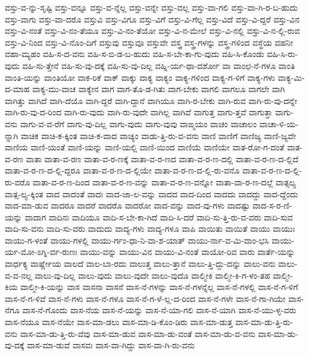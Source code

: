 {ವಸ್ತು-ವ-ನ್ನು-ಸೃಷ್ಟಿ
ವಸ್ತು-ವನ್ನೂ
ವಸ್ತು-ವ-ನ್ನೆಲ್ಲ
ವಸ್ತು-ವನ್ನೇ
ವಸ್ತು-ವಲ್ಲ
ವಸ್ತು-ವಾ-ಗಲಿ
ವಸ್ತು-ವಾ-ಗಿ-ರ-ಬ-ಹುದು
ವಸ್ತು-ವಾಗು
ವಸ್ತು-ವಾ-ದರೊ
ವಸ್ತುವಿ
ವಸ್ತು-ವಿಗೂ
ವಸ್ತು-ವಿಗೆ
ವಸ್ತು-ವಿ-ಗೆಲ್ಲ
ವಸ್ತು-ವಿದೆ
ವಸ್ತು-ವಿ-ದ್ದರೆ
ವಸ್ತು-ವಿನ
ವಸ್ತು-ವಿ-ನಂತೆ
ವಸ್ತು-ವಿ-ನಂ-ತೆಯೂ
ವಸ್ತು-ವಿ-ನಂ-ತೆಯೋ
ವಸ್ತು-ವಿ-ನ-ಮೇಲೆ
ವಸ್ತು-ವಿ-ನಲ್ಲಿ
ವಸ್ತು-ವಿ-ನ-ಲ್ಲಿ-ರುವ
ವಸ್ತು-ವಿ-ನಿಂದ
ವಸ್ತು-ವಿ-ನೊಂ-ದಿಗೆ
ವಸ್ತುವು
ವಸ್ತುವೂ
ವಸ್ತುವೇ
ವಸ್ತ್ರ
ವಸ್ತ್ರ-ಗಳನ್ನು
ವಸ್ತ್ರ-ಗಳಿಂದ
ವಸ್ಥೆಯ
ವಹನೀ
ವಹಾ-ಮ್ಯಹಂ
ವಹಿ-ಸ-ದ-ವನು
ವಹಿ-ಸ-ಬಿ-ಡ-ಬ-ಹುದು
ವಹಿ-ಸ-ಬೇ-ಕಾ-ಗು-ವುದು
ವಹಿ-ಸಿ-ಕೊಂಡು
ವಹಿ-ಸಿ-ರು-ವುದು
ವಹಿ-ಸು-ತ್ತೇನೆ
ವಹಿ-ಸು-ವು-ದಕ್ಕೆ
ವಹಿ-ಸು-ವು-ದಿಲ್ಲ
ವಹ್ನಿ-ರ್ಯ-ಥಾ-ದರ್ಶೋ
ವಾ
ವಾಂಛ-ನೆ-ಗಳೂ
ವಾಂತಿ
ವಾಂತಿ-ಯನ್ನು
ವಾಂತಿಯೋ
ವಾಕ-ರಿಕೆ
ವಾಕ್
ವಾಕ್ಕು
ವಾಕ್ಯ
ವಾಕ್ಯಂ
ವಾಕ್ಯ-ಗಳಿಂದ
ವಾಕ್ಯ-ಗ-ಳಿಗೆ
ವಾಕ್ಯ-ಗಳು
ವಾಕ್ಯ-ಮಿ-ದ-ಮಾಹ
ವಾಕ್ಯ-ಮು-ವಾಚ
ವಾಕ್ಯೇನ
ವಾಗ
ವಾಗ-ತೊ-ಡ-ಗಿತು
ವಾಗ-ಬೇಕು
ವಾಗಲಿ
ವಾಗಲೂ
ವಾಗಲೇ
ವಾಗಿ
ವಾಗಿತ್ತು
ವಾಗಿದೆ
ವಾಗಿ-ದೆಯೊ
ವಾಗಿ-ದ್ದರೆ
ವಾಗಿ-ದ್ದಾನೆ
ವಾಗಿಯೂ
ವಾಗಿ-ರ-ಬೇಕು
ವಾಗಿ-ರುವ
ವಾಗಿ-ರು-ವು-ದನ್ನೇ
ವಾಗಿ-ರು-ವು-ದ-ರಿಂದ
ವಾಗಿ-ರು-ವುದು
ವಾಗಿ-ರು-ವುದೇ
ವಾಗಿಲ್ಲ
ವಾಗಿವೆ
ವಾಗುತ್ತ
ವಾಗು-ತ್ತವೆ
ವಾಗುತ್ತಾ
ವಾಗು-ವನು
ವಾಗು-ವ-ವ-ರೆಗೆ
ವಾಗು-ವು-ದಿಲ್ಲ
ವಾಗು-ವುದು
ವಾಗು-ವುವು
ವಾಙ್ಮಯಂ
ವಾಚಂ
ವಾಚಾಲಂ
ವಾಚಾ-ಳಿ-ಯ-ನ್ನಾಗಿ
ವಾಚಿಕ
ವಾಚಿ-ಕ-ಕ್ಕಿಂತ
ವಾಚಿ-ಕ-ವಾದ
ವಾಚ್ಯಂ
ವಾಡು-ತ್ತಿ-ರು-ವ-ವನು
ವಾಣಿ
ವಾಣಿಗೆ
ವಾಣಿಜ್ಯ
ವಾಣಿ-ಜ್ಯವೇ
ವಾಣಿಯ
ವಾಣಿ-ಯಂತೆ
ವಾಣಿ-ಯನ್ನು
ವಾಣಿ-ಯಲ್ಲಿ
ವಾಣಿ-ಯಿಂದ
ವಾಣಿಯೆ
ವಾಣಿಯೇ
ವಾತ-ರೋ-ಗ-ದಂತೆ
ವಾತ-ವ-ರಣ
ವಾತಾ
ವಾತಾ-ವ-ರಣ
ವಾತಾ-ವ-ರ-ಣಕ್ಕೆ
ವಾತಾ-ವ-ರ-ಣದ
ವಾತಾ-ವ-ರ-ಣ-ದಲ್ಲಿ
ವಾತಾ-ವ-ರ-ಣ-ದ-ಲ್ಲಿದೆ
ವಾತಾ-ವ-ರ-ಣ-ದ-ಲ್ಲಿ-ದ್ದರೂ
ವಾತಾ-ವ-ರ-ಣ-ದ-ಲ್ಲಿಯೇ
ವಾತಾ-ವ-ರ-ಣ-ದ-ಲ್ಲಿ-ರು-ವನೊ
ವಾತಾ-ವ-ರ-ಣ-ದ-ಲ್ಲಿ-ರು-ವರೊ
ವಾತಾ-ವ-ರ-ಣ-ದಿಂದ
ವಾತಾ-ವ-ರ-ಣ-ವನ್ನು
ವಾತಾ-ವ-ರ-ಣ-ವನ್ನೋ
ವಾತಾ-ವಾ-ರ-ಣ-ದಲ್ಲೆ
ವಾತ್ಸಲ್ಯ
ವಾತ್ಸ-ಲ್ಯ-ಕ್ಕಿಂತ
ವಾದ
ವಾದಂತೆ
ವಾದಃ
ವಾದ-ಜಾ-ಲ-ವನ್ನು
ವಾದದ
ವಾದ-ದಿಂದ
ವಾದದು
ವಾದದ್ದು
ವಾದ-ದ್ದೆಂದು
ವಾದ-ಮಾ-ಡುವ
ವಾದರೂ
ವಾದರೆ
ವಾದರೊ
ವಾದರೋ
ವಾದ-ವನ್ನು
ವಾದ-ವು-ಗಳು
ವಾದಷ್ಟು
ವಾದ-ಸ-ರ-ಣಿ-ಯನ್ನು
ವಾದಾಗ
ವಾದಿನಃ
ವಾದಿಯೂ
ವಾದಿ-ಸ-ಬೇ-ಕಾ-ಗಿದೆ
ವಾದಿ-ಸಿ-ದರೆ
ವಾದಿ-ಸು-ತ್ತಿ-ರು-ವ-ವರು
ವಾದಿ-ಸುವ
ವಾದಿ-ಸು-ವನು
ವಾದಿ-ಸು-ವರು
ವಾದುದು
ವಾದ್ಯ-ಗಳು
ವಾದ್ಯ-ಗಳೂ
ವಾಪಿ
ವಾಯಿತು
ವಾಯಿತೆ
ವಾಯು
ವಾಯುಃ
ವಾಯು-ಗ-ಳಂತೆ
ವಾಯು-ಗಳಲ್ಲಿ
ವಾಯು-ರ್ಗಂ-ಧಾ-ನಿ-ವಾ-ಶ-ಯಾತ್
ವಾಯು-ರ್ನಾ-ವ-ಮಿ-ವಾಂ-ಭಸಿ
ವಾಯು-ರ್ಯ-ಮೋ-ಽಗ್ನಿ-ರ್ವ-ರುಣಃ
ವಾಯು-ವನ್ನು
ವಾಯು-ವಿನ
ವಾಯು-ವಿ-ನಂತೆ
ವಾಯೋ-ರಿವ
ವಾರು
ವಾರ್ತೆ-ಯನ್ನು
ವಾರ್ಧಕ್ಯ
ವಾರ್ಷ್ಣೇಯ
ವಾಲದೆ
ವಾಲ-ಬಾ-ರದು
ವಾಲುತ್ತ
ವಾಲು-ತ್ತಾನೆ
ವಾಲು-ತ್ತಿ-ದ್ದು-ದನ್ನು
ವಾಲು-ವನು
ವಾಲು-ವ-ವ-ನಲ್ಲ
ವಾಲು-ವು-ದಿಲ್ಲ
ವಾಲು-ವುದು
ವಾಲು-ವುದೇ
ವಾಲು-ವುದೊ
ವಾಲ್ಮೀಕಿ
ವಾಲ್ಮೀ-ಕಿ-ಗ-ಳಂ-ತಹ
ವಾಲ್ಮೀ-ಕಿಯ
ವಾಲ್ಮೀ-ಕಿ-ಯನ್ನು
ವಾಸ
ವಾಸನಾ
ವಾಸನೆ
ವಾಸ-ನೆ-ಗಳನ್ನು
ವಾಸ-ನೆ-ಗಳನ್ನೆಲ್ಲ
ವಾಸ-ನೆ-ಗಳಲ್ಲಿ
ವಾಸ-ನೆ-ಗ-ಳಿಗೆ
ವಾಸ-ನೆ-ಗ-ಳಿವೆ
ವಾಸ-ನೆ-ಗಳು
ವಾಸ-ನೆ-ಗಳೂ
ವಾಸ-ನೆ-ಗ-ಳೆ-ಲ್ಲ-ದ-ರಿಂದ
ವಾಸ-ನೆ-ಗಳೇ
ವಾಸ-ನೆ-ಗಾ-ಗಿಯೇ
ವಾಸ-ನೆಗೂ
ವಾಸ-ನೆ-ಗೊಂದು
ವಾಸ-ನೆಯ
ವಾಸ-ನೆ-ಯನ್ನು
ವಾಸ-ನೆ-ಯಾ-ಗಲಿ
ವಾಸ-ನೆ-ಯಾಗಿ
ವಾಸ-ನೆ-ಯು-ಳ್ಳ-ವರು
ವಾಸ-ನೆಯೂ
ವಾಸ-ನೆಯೇ
ವಾಸ-ಮಾ-ಡಲು
ವಾಸ-ಮಾ-ಡಿ-ಕೊಂ-ಡಿರು
ವಾಸ-ಮಾ-ಡುತ್ತ
ವಾಸ-ಮಾ-ಡು-ತ್ತಿ-ರು-ವನು
ವಾಸ-ಮಾ-ಡು-ತ್ತಿ-ರು-ವೆವು
ವಾಸ-ಮಾ-ಡುವ
ವಾಸ-ಮಾ-ಡು-ವಂತೆ
ವಾಸ-ಮಾ-ಡು-ವ-ವನು
ವಾಸ-ಮಾ-ಡು-ವು-ದಕ್ಕೆ
ವಾಸ-ಮಾ-ಡುವೆ
ವಾಸವಃ
ವಾಸ-ವಾ-ಗಿದ್ದು
ವಾಸ-ವಾ-ಗಿ-ರು-ವನು
}
